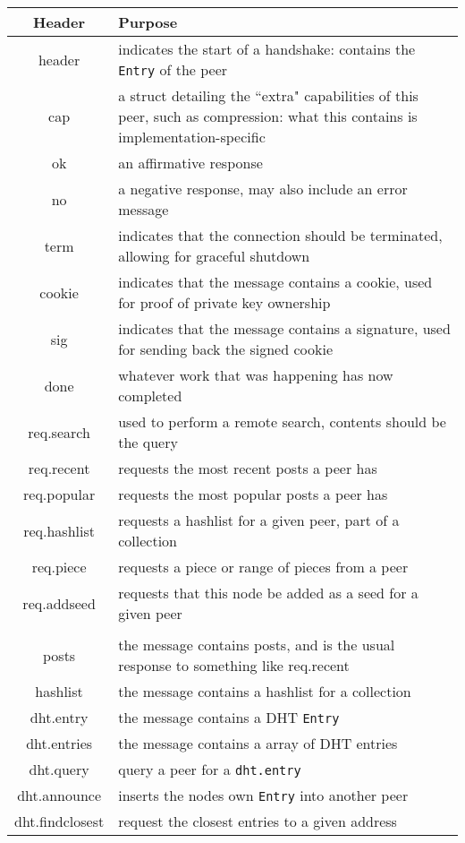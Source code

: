 	\begin{center}
		\begin{tabular}{ c|p{8cm} }
		\textbf{Header} & \textbf{Purpose} \\  
		\hline
		header          & indicates the start of a handshake: contains the \texttt{Entry}
		                   of the peer \\
		\hline
		cap             & a struct detailing the ``extra" capabilities of this
		                 peer, such as compression: what this contains is 
						 implementation-specific \\
		\hline
		ok              & an affirmative response \\
		\hline
		no              & a negative response, may also include an error message \\
		\hline
		term            & indicates that the connection should be terminated,
		                  allowing for graceful shutdown \\
		\hline
		cookie          & indicates that the message contains a cookie, used for
		                  proof of private key ownership \\
		\hline
		sig             & indicates that the message contains a signature, used
		                  for sending back the signed cookie \\
		\hline
		done            & whatever work that was happening has now completed \\
		\hline
		req.search      & used to perform a remote search, contents should be
		                  the query \\
		\hline
		req.recent      & requests the most recent posts a peer has \\
		\hline
		req.popular     & requests the most popular posts a peer has \\
		\hline
		req.hashlist    & requests a hashlist for a given peer, part of a
		                  collection \\
		\hline
		req.piece       & requests a piece or range of pieces from a peer \\
		\hline
		req.addseed     & requests that this node be added as a seed for a given
		                  peer \\
		\\
		\hline
		posts           & the message contains posts, and is the usual response
		                  to something like req.recent \\ 
		\hline 
		hashlist        & the message contains a hashlist for a collection \\
		\hline
		dht.entry       & the message contains a DHT \texttt{Entry} \\
		\hline
		dht.entries     & the message contains a array of DHT entries \\
		\hline
		dht.query       & query a peer for a \texttt{dht.entry} \\
		\hline
		dht.announce    & inserts the nodes own \texttt{Entry} into another peer \\
		\hline
		dht.findclosest & request the closest entries to a given address \\
		\hline



\end{tabular}
\end{center}
